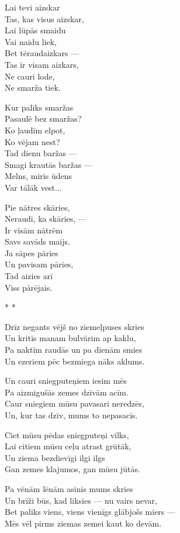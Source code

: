 \documentclass[14pt]{extarticle}
\begin{document}
Lai tevi aizskar\\
Tas, kas visus aizskar,\\
Lai lūpās smaidu\\
Vai naidu liek,\\
Bet tēraudaizkars ---\\
Tas ir visam aizkars,\\
Ne cauri lode,\\
Ne smarža tiek.

Kur paliks smaržas\\
Pasaulē bez smaržas?\\
Ko ļaudīm elpot,\\
Ko vējam nest?\\
Tad dienu baržas ---\\
Smagi krautās baržas ---\\
Melns, miris ūdens\\
Var tālāk vest...

Pie nātres skāries,\\
Neraudi, ka skāries, ---\\
Ir visām nātrēm\\
Savs savāds maijs.\\
Ja sāpes pāries\\
Un pavisam pāries,\\
Tad aizies arī\\
Viss pārējais.


\newpage

{\large \sc * * *}

Drīz negants vējš no ziemeļpuses skries\\
Un kritīs manam bulvārim ap kaklu,\\
Pa naktīm raudās un pa dienām smies\\
Un ezeriem pēc bezmiega nāks aklums.

Un cauri sniegputeņiem iesim mēs\\
Pa aizmigušās zemes dzīvām acīm.\\
Caur sniegiem mūsu pavasari neredzēs,\\
Un, kur tas dzīv, mums to nepasacīs.

Ciet mūsu pēdas sniegputeņi vilks,\\
Lai citiem mūsu ceļu atrast grūtāk,\\
Un ziema bezdievīgi ilgi ilgs\\
Gan zemes klajumos, gan mūsu jūtās.

Pa vēnām lēnām asinis mums skries\\
Un brīži būs, kad liksies --- nu vairs nevar,\\
Bet paliks viens, viens vienīgs glābjošs miers ---\\
Mēs vēl pirms ziemas zemei kaut ko devām.
\end{document}
